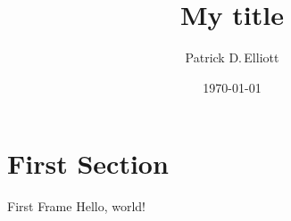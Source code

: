 \documentclass{beamer}
\title{My title}
\date{\today}
\author{Patrick D.\,Elliott}
\institute{Centre for Modern Beamer Themes}
\begin{document}
  \maketitle
  \section{First Section}
  \begin{frame}{First Frame}
    Hello, world!
  \end{frame}
\end{document}

